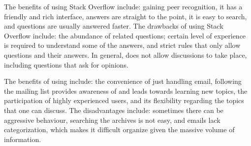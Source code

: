\begin{description}[itemsep=2pt, topsep=0pt, leftmargin=1em, parsep=0pt]
\item[\SO:]
    The benefits of using Stack Overflow include: gaining peer recognition, it has a friendly and rich interface, answers are straight to the point, it is
    easy to search, and questions are usually answered faster.
    The drawbacks of using Stack Overflow include: the abundance
    of related questions; certain level of experience is required to understand some of the answers, and \SO strict rules that only allow questions and their answers. In
    general, \SO does not allow discussions to take place, including questions that ask for opinions.

\item[\RH:]
The benefits of using \RH include: the convenience of just handling email, following the mailing list provides awareness of and leads towards
learning new topics, the participation of highly experienced
users, and its flexibility regarding the topics that one can discuss.  The disadvantages include: sometimes there can be aggressive
behaviour, searching the archives is not easy, and emails lack categorization, which makes it difficult organize given the massive volume of information.
\end{description}

